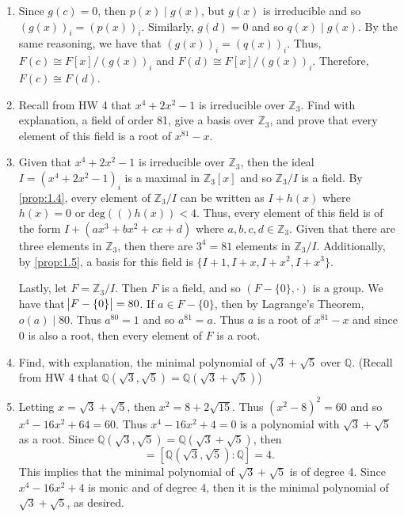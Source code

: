 \documentclass[leqno]{article}
\makeatletter
\newcommand{\deg}[1]{\text{deg}(#1)}
\theoremstyle{definition}
\theoremstyle{remark}
\let\oldproofname=\proofname
\renewcommand{\proofname}{\textit{\oldproofname}}
\theoremstyle{definition}
\renewenvironment{proof}[1][\proofname]{\par
  \pushQED{\qed}%
  \normalfont \topsep6\p@\@plus6\p@\relax
  \list{}{\leftmargin=0mm
          \rightmargin=0mm
          \settowidth{\itemindent}{\itshape#1}%
          \labelwidth=\itemindent
          \parsep=0pt \listparindent=0mm%
  }
  \item[\hskip\labelsep
        \itshape
    #1\@addpunct{.}]\ignorespaces
}{%
  \popQED\endlist\@endpefalse
}
\makeatother
\begin{document}
\begin{enumerate}[leftmargin=*]
\begin{proof}
            Since $g(c)=0$, then $p(x)\mid g(x)$, but $g(x)$ is irreducible and so $(g(x))_i=(p(x))_i$. Similarly, $g(d)=0$ and so $q(x)\mid g(x)$. By the same reasoning, we have that $(g(x))_i=(q(x))_i$. Thus, $F(c)\cong F[x]/(g(x))_i$ and $F(d)\cong F[x]/(g(x))_i$. Therefore, $F(c)\cong F(d)$.
        \end{proof}
    \item Recall from HW 4 that $x^4+2x^2-1$ is irreducible over $\mathbb{Z}_3$. Find with explanation, a field of order 81, give a basis over $\mathbb{Z}_3$, and prove that every element of this field is a root of $x^{81}-x$.
        \begin{proof}
            Given that $x^4+2x^2-1$ is irreducible over $\mathbb{Z}_3$, then the ideal $I=(x^4+2x^2-1)_i$ is a maximal in $\mathbb{Z}_3[x]$ and so $\mathbb{Z}_3/I$ is a field. By \cref{prop:1.4}, every element of $\mathbb{Z}_3/I$ can be written as $I+h(x)$ where $h(x)=0$ or $\deg(h(x))<4$. Thus, every element of this field is of the form $I+(ax^3+bx^2+cx+d)$ where $a,b,c,d\in\mathbb{Z}_3$. Given that there are three elements in $\mathbb{Z}_3$, then there are $3^4=81$ elements in $\mathbb{Z}_3/I$. Additionally, by \cref{prop:1.5}, a basis for this field is $\{I+1,I+x,I+x^2,I+x^3\}$.\par\hspace{4mm} Lastly, let $F=\mathbb{Z}_3/I$. Then $F$ is a field, and so $(F-\{0\},\cdot)$ is a group. We have that  $\abs{F-\{0\}}=80$. If $a\in F-\{0\}$, then by Lagrange's Theorem, $o(a)\mid 80$. Thus $a^{80}=1$ and so $a^{81}=a$. Thus $a$ is a root of $x^{81}-x$ and since 0 is also a root, then every element of $F$ is a root.
        \end{proof}
    \item Find, with explanation, the minimal polynomial of $\sqrt{3}+\sqrt{5}$ over $\mathbb{Q}$. (Recall from HW 4 that $\mathbb{Q}(\sqrt{3},\sqrt{5})=\mathbb{Q}(\sqrt{3}+\sqrt{5})$)
        \begin{proof}
            Letting $x=\sqrt{3}+\sqrt{5}$, then $x^2=8+2\sqrt{15}$. Thus $(x^2-8)^2=60$ and so $x^4-16x^2+64=60$. Thus $x^4-16x^2+4=0$ is a polynomial with $\sqrt{3}+\sqrt{5}$ as a root. Since $\mathbb{Q}(\sqrt{3},\sqrt{5})=\mathbb{Q}(\sqrt{3}+\sqrt{5})$, then 
                \begin{equation*}
                    [\mathbb{Q}(\sqrt{3}+\sqrt{5}\colon\mathbb{Q}]=[\mathbb{Q}(\sqrt{3},\sqrt{5})\colon\mathbb{Q}]=4.
                \end{equation*}
            This implies that the minimal polynomial of $\sqrt{3}+\sqrt{5}$ is of degree 4. Since $x^4-16x^2+4$ is monic and of degree 4, then it is the minimal polynomial of $\sqrt{3}+\sqrt{5}$, as desired.

\end{proof}
\end{enumerate}
\end{document}
